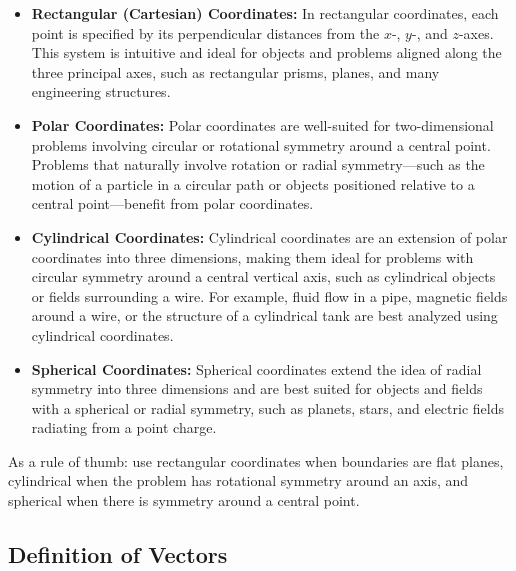 \begin{itemize}
    \item \textbf{Rectangular (Cartesian) Coordinates:} 
    In rectangular coordinates, each point is specified by its perpendicular distances from the \( x \)-, \( y \)-, and \( z \)-axes. This system is intuitive and ideal for objects and problems aligned along the three principal axes, such as rectangular prisms, planes, and many engineering structures.
    \item \textbf{Polar Coordinates:}
    Polar coordinates are well-suited for two-dimensional problems involving circular or rotational symmetry around a central point. Problems that naturally involve rotation or radial symmetry—such as the motion of a particle in a circular path or objects positioned relative to a central point—benefit from polar coordinates.

    \item \textbf{Cylindrical Coordinates:} 
    Cylindrical coordinates are an extension of polar coordinates into three dimensions, making them ideal for problems with circular symmetry around a central vertical axis, such as cylindrical objects or fields surrounding a wire. For example, fluid flow in a pipe, magnetic fields around a wire, or the structure of a cylindrical tank are best analyzed using cylindrical coordinates.

    \item \textbf{Spherical Coordinates:} 
    Spherical coordinates extend the idea of radial symmetry into three dimensions and are best suited for objects and fields with a spherical or radial symmetry, such as planets, stars, and electric fields radiating from a point charge.
\end{itemize}

\noindent As a rule of thumb: use rectangular coordinates when boundaries are flat planes, cylindrical when the problem has rotational symmetry around an axis, and spherical when there is symmetry around a central point.



\newpage


 

\subsection*{Definition of Vectors}

